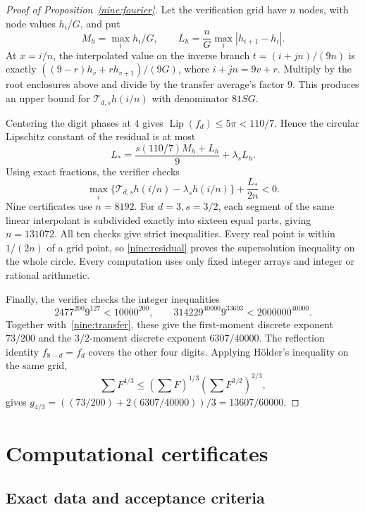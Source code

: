 \documentclass[11pt,a4paper]{article}
\theoremstyle{paperplain}
\numberwithin{equation}{section}
\begin{document}
\begin{proof}[Proof of Proposition~\ref{nine:fourier}]
Let the verification grid have $n$ nodes, with node values $h_i/G$, and put
\[
 M_h=\max_i h_i/G,\qquad
 L_h=\frac nG\max_i|h_{i+1}-h_i|.
\]
At $x=i/n$, the interpolated value on the inverse branch
$t=(i+jn)/(9n)$ is exactly
$((9-r)h_v+rh_{v+1})/(9G)$, where $i+jn=9v+r$.
Multiply by the root enclosures above and divide by the transfer average's
factor $9$. This produces an upper bound for
$\mathcal T_{d,s}h(i/n)$ with denominator $81SG$.

Centering the digit phases at $4$ gives
$\operatorname{Lip}(f_d)\le5\pi<110/7$.
Hence the circular Lipschitz constant of the residual is at most
\begin{equation}\label{nine:lip}
 L_*=\frac{s(110/7)M_h+L_h}{9}+\lambda_sL_h.
\end{equation}
Using exact fractions, the verifier checks
\begin{equation}\label{nine:residual}
 \max_i\{\mathcal T_{d,s}h(i/n)-\lambda_sh(i/n)\}
       +\frac{L_*}{2n}<0.
\end{equation}
Nine certificates use $n=8192$.
For $d=3,s=3/2$, each segment of the same linear interpolant is subdivided
exactly into sixteen equal parts, giving $n=131072$.
All ten checks give strict inequalities.
Every real point is within $1/(2n)$ of a grid point, so
\eqref{nine:residual} proves the supersolution inequality on the whole circle.
Every computation uses only fixed integer arrays and integer or rational arithmetic.

Finally, the verifier checks the integer inequalities
\[
 2477^{200}9^{127}<10000^{200},\qquad
 314229^{40000}9^{33693}<2000000^{40000}.
\]
Together with~\eqref{nine:transfer}, these give the first-moment discrete
exponent $73/200$ and the $3/2$-moment discrete exponent $6307/40000$.
The reflection identity $f_{8-d}=f_d$ covers the other four digits.
Applying H\"older's inequality on the same grid,
\[
 \sum F^{4/3}\le\left(\sum F\right)^{1/3}
                     \left(\sum F^{3/2}\right)^{2/3},
\]
gives $g_{4/3}=((73/200)+2(6307/40000))/3=13607/60000$.
\end{proof}

\section{Computational certificates}\label{app:reproduce}

\subsection{Exact data and acceptance criteria}
\end{document}
